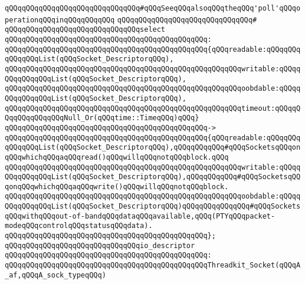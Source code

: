 \verb|qQQqqQQqqQQqqQQqqQQqqQQqqQQqqQQq#qQQqSeeqQQqalsoqQQqtheqQQq'poll'qQQqoperationqQQqinqQQqqQQqqQQq|\newline
\verb|qQQqqQQqqQQqqQQqqQQqqQQqqQQqqQQq#|\newline
\verb|qQQqqQQqqQQqqQQqqQQqqQQqqQQqqQQqselect|\newline
\verb|qQQqqQQqqQQqqQQqqQQqqQQqqQQqqQQqqQQqqQQqqQQqqQQq:|\newline
\verb|qQQqqQQqqQQqqQQqqQQqqQQqqQQqqQQqqQQqqQQqqQQqqQQq{qQQqreadable:qQQqqQQqqQQqqQQqList(qQQqSocket_DescriptorqQQq),|\newline
\verb|qQQqqQQqqQQqqQQqqQQqqQQqqQQqqQQqqQQqqQQqqQQqqQQqqQQqqQQqwritable:qQQqqQQqqQQqqQQqList(qQQqSocket_DescriptorqQQq),|\newline
\verb|qQQqqQQqqQQqqQQqqQQqqQQqqQQqqQQqqQQqqQQqqQQqqQQqqQQqqQQqoobdable:qQQqqQQqqQQqqQQqList(qQQqSocket_DescriptorqQQq),|\newline
\verb|qQQqqQQqqQQqqQQqqQQqqQQqqQQqqQQqqQQqqQQqqQQqqQQqqQQqqQQqtimeout:qQQqqQQqqQQqqQQqqQQqNull_Or(qQQqtime::TimeqQQq)qQQq}|\newline
\verb|qQQqqQQqqQQqqQQqqQQqqQQqqQQqqQQqqQQqqQQqqQQqqQQq->|\newline
\verb|qQQqqQQqqQQqqQQqqQQqqQQqqQQqqQQqqQQqqQQqqQQqqQQq{qQQqreadable:qQQqqQQqqQQqqQQqList(qQQqSocket_DescriptorqQQq),qQQqqQQqqQQq#qQQqSocketsqQQqonqQQqwhichqQQqaqQQqread()qQQqwillqQQqnotqQQqblock.qQQq|\newline
\verb|qQQqqQQqqQQqqQQqqQQqqQQqqQQqqQQqqQQqqQQqqQQqqQQqqQQqqQQqwritable:qQQqqQQqqQQqqQQqList(qQQqSocket_DescriptorqQQq),qQQqqQQqqQQq#qQQqSocketsqQQqonqQQqwhichqQQqaqQQqwrite()qQQqwillqQQqnotqQQqblock.|\newline
\verb|qQQqqQQqqQQqqQQqqQQqqQQqqQQqqQQqqQQqqQQqqQQqqQQqqQQqqQQqoobdable:qQQqqQQqqQQqqQQqList(qQQqSocket_DescriptorqQQq)qQQqqQQqqQQqqQQq#qQQqSocketsqQQqwithqQQqout-of-bandqQQqdataqQQqavailable,qQQq(PTYqQQqpacket-modeqQQqcontrolqQQqstatusqQQqdata).|\newline
\verb|qQQqqQQqqQQqqQQqqQQqqQQqqQQqqQQqqQQqqQQqqQQqqQQq};|\newline
\newline
\verb|qQQqqQQqqQQqqQQqqQQqqQQqqQQqqQQqio_descriptor|\newline
\verb|qQQqqQQqqQQqqQQqqQQqqQQqqQQqqQQqqQQqqQQqqQQqqQQq:|\newline
\verb|qQQqqQQqqQQqqQQqqQQqqQQqqQQqqQQqqQQqqQQqqQQqqQQqThreadkit_Socket(qQQqA_af,qQQqA_sock_typeqQQq)|\newline
